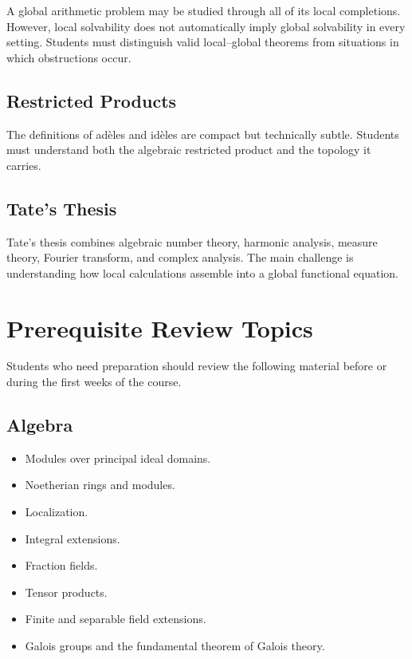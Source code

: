\documentclass[11pt]{article}
\begin{document}
A global arithmetic problem may be studied through all of its local
completions. However, local solvability does not automatically imply global
solvability in every setting. Students must distinguish valid local--global
theorems from situations in which obstructions occur.

\subsection{Restricted Products}

The definitions of adèles and idèles are compact but technically subtle.
Students must understand both the algebraic restricted product and the
topology it carries.

\subsection{Tate's Thesis}

Tate's thesis combines algebraic number theory, harmonic analysis, measure
theory, Fourier transform, and complex analysis. The main challenge is
understanding how local calculations assemble into a global functional
equation.

\section{Prerequisite Review Topics}

Students who need preparation should review the following material before or
during the first weeks of the course.

\subsection{Algebra}

\begin{itemize}
    \item Modules over principal ideal domains.
    \item Noetherian rings and modules.
    \item Localization.
    \item Integral extensions.
    \item Fraction fields.
    \item Tensor products.
    \item Finite and separable field extensions.
    \item Galois groups and the fundamental theorem of Galois theory.
\end{itemize}
\end{document}
